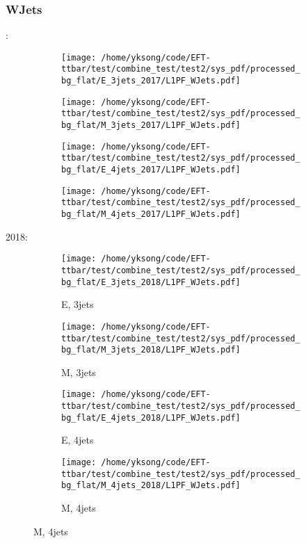 \documentclass{beamer}
\begin{document}
\begin{frame}
\frametitle{WJets}
\fontsize{5}{1}:
\begin{figure}
\centering
\begin{subfigure}[b]{0.24\textwidth}
\texttt{[image: /home/yksong/code/EFT-ttbar/test/combine\_test/test2/sys\_pdf/processed\_bg\_flat/E\_3jets\_2017/L1PF\_WJets.pdf]}
\end{subfigure}
\begin{subfigure}[b]{0.24\textwidth}
\texttt{[image: /home/yksong/code/EFT-ttbar/test/combine\_test/test2/sys\_pdf/processed\_bg\_flat/M\_3jets\_2017/L1PF\_WJets.pdf]}
\end{subfigure}
\begin{subfigure}[b]{0.24\textwidth}
\texttt{[image: /home/yksong/code/EFT-ttbar/test/combine\_test/test2/sys\_pdf/processed\_bg\_flat/E\_4jets\_2017/L1PF\_WJets.pdf]}
\end{subfigure}
\begin{subfigure}[b]{0.24\textwidth}
\texttt{[image: /home/yksong/code/EFT-ttbar/test/combine\_test/test2/sys\_pdf/processed\_bg\_flat/M\_4jets\_2017/L1PF\_WJets.pdf]}
\end{subfigure}
\end{figure}
2018:
\begin{figure}
\centering
\begin{subfigure}[b]{0.24\textwidth}
\texttt{[image: /home/yksong/code/EFT-ttbar/test/combine\_test/test2/sys\_pdf/processed\_bg\_flat/E\_3jets\_2018/L1PF\_WJets.pdf]}
\captionsetup{font=tiny}
\caption{E, 3jets}
\end{subfigure}
\begin{subfigure}[b]{0.24\textwidth}
\texttt{[image: /home/yksong/code/EFT-ttbar/test/combine\_test/test2/sys\_pdf/processed\_bg\_flat/M\_3jets\_2018/L1PF\_WJets.pdf]}
\captionsetup{font=tiny}
\caption{M, 3jets}
\end{subfigure}
\begin{subfigure}[b]{0.24\textwidth}
\texttt{[image: /home/yksong/code/EFT-ttbar/test/combine\_test/test2/sys\_pdf/processed\_bg\_flat/E\_4jets\_2018/L1PF\_WJets.pdf]}
\captionsetup{font=tiny}
\caption{E, 4jets}
\end{subfigure}
\begin{subfigure}[b]{0.24\textwidth}
\texttt{[image: /home/yksong/code/EFT-ttbar/test/combine\_test/test2/sys\_pdf/processed\_bg\_flat/M\_4jets\_2018/L1PF\_WJets.pdf]}
\captionsetup{font=tiny}
\caption{M, 4jets}
\end{subfigure}
\end{figure}
\end{frame}
\end{document}
